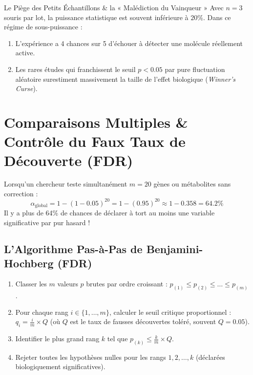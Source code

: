 \documentclass[11pt,a4paper]{article}
\begin{document}
\begin{warnbox}{Le Piège des Petits Échantillons \& la « Malédiction du Vainqueur »}
Avec $n = 3$ souris par lot, la puissance statistique est souvent inférieure à $20\%$. Dans ce régime de sous-puissance :
\begin{enumerate}
  \item L'expérience a 4 chances sur 5 d'échouer à détecter une molécule réellement active.
  \item Les rares études qui franchissent le seuil $p < 0.05$ par pure fluctuation aléatoire surestiment massivement la taille de l'effet biologique (\textit{Winner's Curse}).
\end{enumerate}
\end{warnbox}

\section{Comparaisons Multiples \& Contrôle du Faux Taux de Découverte (FDR)}

Lorsqu'un chercheur teste simultanément $m = 20$ gènes ou métabolites sans correction :
\begin{equation*}
  \alpha_{\text{global}} = 1 - (1 - 0.05)^{20} = 1 - (0.95)^{20} \approx 1 - 0.358 = \mathbf{64.2\%}
\end{equation*}
Il y a plus de 64\% de chances de déclarer à tort au moins une variable significative par pur hasard !

\subsection{L'Algorithme Pas-à-Pas de Benjamini-Hochberg (FDR)}
\begin{enumerate}[leftmargin=*, label=\faCalculator\ \textbf{\arabic*.}]
  \item Classer les $m$ valeurs $p$ brutes par ordre croissant : $p_{(1)} \le p_{(2)} \le \dots \le p_{(m)}$.
  \item Pour chaque rang $i \in \{1, \dots, m\}$, calculer le seuil critique proportionnel : $q_i = \frac{i}{m} \times Q$ (où $Q$ est le taux de fausses découvertes toléré, souvent $Q = 0.05$).
  \item Identifier le plus grand rang $k$ tel que $p_{(k)} \le \frac{k}{m} \times Q$.
  \item Rejeter toutes les hypothèses nulles pour les rangs $1, 2, \dots, k$ (déclarées biologiquement significatives).
\end{enumerate}
\end{document}
